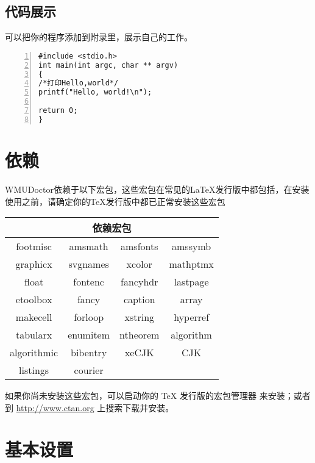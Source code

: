 \subsection{代码展示}
可以把你的程序添加到附录里，展示自己的工作。
\begin{lstlisting}[language={[ANSI]C}, numbers=left]
#include <stdio.h>
int main(int argc, char ** argv)
{
/*打印Hello,world*/
printf("Hello, world!\n");

return 0;
}
\end{lstlisting}
\section{依赖}
WMUDoctor依赖于以下宏包，这些宏包在常见的\LaTeX{}发行版中都包括，在安装使用之前，请确定你的\TeX{}发行版中都已正常安装这些宏包
\begin{table}[H]
    \centering
    \begin{tabular}{cccc}
        \toprule
        \multicolumn{4}{c}{依赖宏包} \\
        \midrule
        {footmisc}    & {amsmath}  & {amsfonts} & {amssymb}   \\
        
        {graphicx}    & {svgnames} & {xcolor}   & {mathptmx}  \\

        {float}       & {fontenc}  & {fancyhdr} & {lastpage}  \\

        {etoolbox}    & {fancy}    & {caption}  & {array}     \\

        {makecell}    & {forloop}  & {xstring}  & {hyperref}  \\

        {tabularx}    & {enumitem} & {ntheorem} & {algorithm} \\

        {algorithmic} & {bibentry} & {xeCJK}    & {CJK}       \\
        {listings}    & {courier}  & {}         & {}          \\
        \bottomrule
    \end{tabular}
\end{table}
如果你尚未安装这些宏包，可以启动你的 \TeX{} 发行版的宏包管理器
来安装；或者到 \url{http://www.ctan.org} 上搜索下载并安装。

\section{基本设置}

